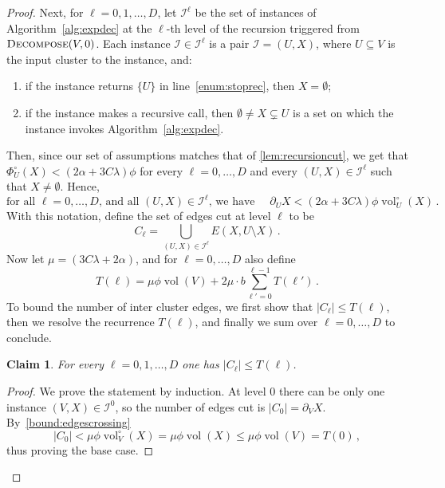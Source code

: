 \documentclass[epsfig,letter,11pt]{article}
\numberwithin{equation}{section}
\DeclareMathOperator{\vol}{vol}
\newcommand{\unvolc}[2]{\operatorname{vol}_{#2}^\circ (#1)}
\newcommand{\unspc}[2]{\Phi_{#2}^\circ (#1)}
\newcommand{\uncut}[2]{{\partial}_{#2} #1}
\newcommand{\ed}{\textsc{Decompose}}
\newtheorem{claim}[theorem]{Claim}
\begin{document}
\begin{proof}
	Next, for $\ell=0,1,\dots, D$, let $\mathcal{I}^\ell$ be the set of instances of Algorithm~\ref{alg:expdec} at the $\ell$-th level of the recursion triggered from $\ed(V,0)$. Each instance $\mathcal{I} \in \mathcal{I}^\ell$ is a pair $\mathcal{I}=(U,X)$, where $U \subseteq V$ is the input cluster to the instance, and:
	\begin{enumerate}
		\item \label{case:ret} if the instance returns $\{U\}$ in line~\eqref{enum:stoprec}, then $X=\emptyset$;
		\item if the instance makes a recursive call, then $\emptyset \neq X \subsetneq U$ is a set on which the instance invokes Algorithm~\ref{alg:expdec}.
	\end{enumerate}
	Then, since our set of assumptions matches that of \cref{lem:recursioncut}, we get that $\unspc{X}{U} < (2\alpha+3C\lambda)\phi$ for every $\ell = 0,\dots, D$ and every $(U,X) \in \mathcal{I}^\ell$ such that $X\neq \emptyset$. Hence,
	\begin{equation}
		\label{bound:edgescrossing}
		\text{for all $\ell = 0,\dots, D$, and all $(U,X) \in \mathcal{I}^\ell$, we have }\quad \uncut{X}{U} < (2\alpha+3C\lambda)\phi \unvolc{X}{U} \, .
	\end{equation}
	With this notation, define the set of edges cut at level $\ell$ to be
	\begin{equation*}
		C_\ell = \bigcup_{(U,X) \in \mathcal{I}^\ell} E(X,U \setminus X) \, .
	\end{equation*}
	Now let $\mu = (3C\lambda+2\alpha)$, and for $\ell=0, \dots, D$ also define
	\begin{equation*}
		T(\ell) = \mu \phi \vol(V) +2  \mu \cdot b\sum_{\ell'=0}^{\ell-1}T(\ell') \, .
	\end{equation*}
	To bound the number of inter cluster edges, we first show that $|C_\ell| \le T(\ell)$, then we resolve the recurrence $T(\ell)$, and finally we sum over $\ell=0,\dots, D$ to conclude.
	
	\begin{claim}
		\label{claim:levelcut}
		For every $\ell=0,1,\dots, D$ one has $|C_\ell| \le T(\ell)$.
	\end{claim}
\begin{proof}
	We prove the statement by induction. At level $0$ there can be only one instance $(V,X) \in \mathcal{I}^0$, so the number of edges cut is $|C_0| = \uncut{X}{V}$. By~\eqref{bound:edgescrossing}
	\begin{equation*}
		|C_0| < \mu \phi  \unvolc{X}{V} =  \mu \phi  \vol(X) \le \mu \phi \vol(V) = T(0) \, ,
	\end{equation*}
thus proving the base case.


\end{proof}
\end{proof}
\end{document}
